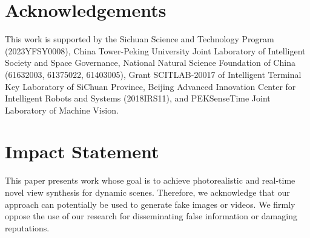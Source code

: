 \section*{Acknowledgements}

This work is supported by the Sichuan Science and Technology Program (2023YFSY0008), China Tower-Peking University Joint Laboratory of Intelligent Society and Space Governance, National Natural Science Foundation of China (61632003, 61375022, 61403005), Grant SCITLAB-20017 of Intelligent Terminal Key Laboratory of SiChuan Province, Beijing Advanced Innovation Center for Intelligent Robots and Systems (2018IRS11), and PEKSenseTime Joint Laboratory of Machine Vision.

\section*{Impact Statement}
This paper presents work whose goal is to achieve photorealistic and real-time novel view synthesis for dynamic scenes.  
Therefore, we acknowledge that our approach can potentially be used to generate fake images or videos.
We firmly oppose the use of our research for disseminating false information or damaging reputations.
